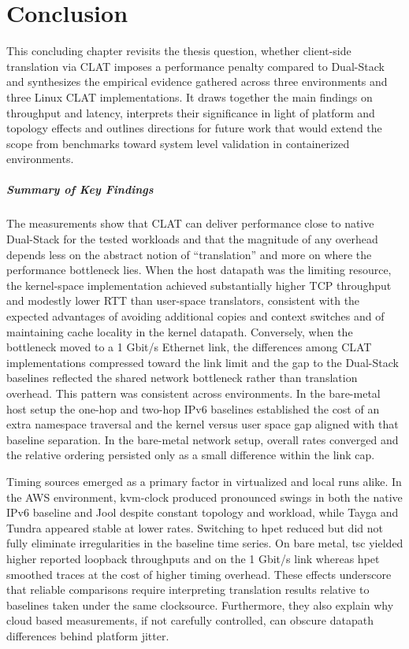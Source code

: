 \chapter{Conclusion}
This concluding chapter revisits the thesis question, whether client-side translation via CLAT imposes a performance penalty compared to Dual-Stack and synthesizes the empirical evidence gathered across three environments and three Linux CLAT implementations. It draws together the main findings on throughput and latency, interprets their significance in light of platform and topology effects and outlines directions for future work that would extend the scope from benchmarks toward system level validation in containerized environments.

\paragraph{Summary of Key Findings}
The measurements show that CLAT can deliver performance close to native Dual-Stack for the tested workloads and that the magnitude of any overhead depends less on the abstract notion of “translation” and more on where the performance bottleneck lies. When the host datapath was the limiting resource, the kernel-space implementation achieved substantially higher TCP throughput and modestly lower RTT than user-space translators, consistent with the expected advantages of avoiding additional copies and context switches and of maintaining cache locality in the kernel datapath. Conversely, when the bottleneck moved to a 1 Gbit/s Ethernet link, the differences among CLAT implementations compressed toward the link limit and the gap to the Dual-Stack baselines reflected the shared network bottleneck rather than translation overhead. This pattern was consistent across environments. In the bare-metal host setup the one-hop and two-hop IPv6 baselines established the cost of an extra namespace traversal and the kernel versus user space gap aligned with that baseline separation. In the bare-metal network setup, overall rates converged and the relative ordering persisted only as a small difference within the link cap.

Timing sources emerged as a primary factor in virtualized and local runs alike. In the AWS environment, kvm-clock produced pronounced swings in both the native IPv6 baseline and Jool despite constant topology and workload, while Tayga and Tundra appeared stable at lower rates. Switching to hpet reduced but did not fully eliminate irregularities in the baseline time series. On bare metal, tsc yielded higher reported loopback throughputs and on the 1 Gbit/s link whereas hpet smoothed traces at the cost of higher timing overhead. These effects underscore that reliable comparisons require interpreting translation results relative to baselines taken under the same clocksource. Furthermore, they also explain why cloud based measurements, if not carefully controlled, can obscure datapath differences behind platform jitter.

